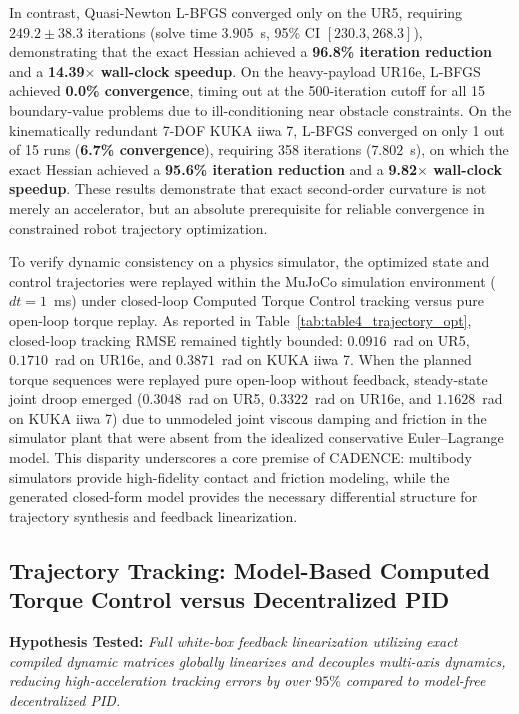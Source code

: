 \documentclass[fleqn,10pt]{article}
\begin{document}
In contrast, Quasi-Newton L-BFGS converged only on the UR5, requiring $249.2 \pm 38.3$ iterations (solve time $3.905$~s, 95\% CI $[230.3, 268.3]$), demonstrating that the exact Hessian achieved a \textbf{96.8\% iteration reduction} and a \textbf{14.39$\times$ wall-clock speedup}. On the heavy-payload UR16e, L-BFGS achieved \textbf{0.0\% convergence}, timing out at the 500-iteration cutoff for all 15 boundary-value problems due to ill-conditioning near obstacle constraints. On the kinematically redundant 7-DOF KUKA iiwa 7, L-BFGS converged on only 1 out of 15 runs (\textbf{6.7\% convergence}), requiring 358 iterations ($7.802$~s), on which the exact Hessian achieved a \textbf{95.6\% iteration reduction} and a \textbf{9.82$\times$ wall-clock speedup}. These results demonstrate that exact second-order curvature is not merely an accelerator, but an absolute prerequisite for reliable convergence in constrained robot trajectory optimization.

To verify dynamic consistency on a physics simulator, the optimized state and control trajectories were replayed within the MuJoCo simulation environment ($dt = 1$~ms) under closed-loop Computed Torque Control tracking versus pure open-loop torque replay. As reported in Table~\ref{tab:table4_trajectory_opt}, closed-loop tracking RMSE remained tightly bounded: $0.0916$~rad on UR5, $0.1710$~rad on UR16e, and $0.3871$~rad on KUKA iiwa 7. When the planned torque sequences were replayed pure open-loop without feedback, steady-state joint droop emerged ($0.3048$~rad on UR5, $0.3322$~rad on UR16e, and $1.1628$~rad on KUKA iiwa 7) due to unmodeled joint viscous damping and friction in the simulator plant that were absent from the idealized conservative Euler--Lagrange model. This disparity underscores a core premise of CADENCE: multibody simulators provide high-fidelity contact and friction modeling, while the generated closed-form model provides the necessary differential structure for trajectory synthesis and feedback linearization.

\subsection{Trajectory Tracking: Model-Based Computed Torque Control versus Decentralized PID}

\noindent\textbf{Hypothesis Tested:} \textit{Full white-box feedback linearization utilizing exact compiled dynamic matrices globally linearizes and decouples multi-axis dynamics, reducing high-acceleration tracking errors by over $95\%$ compared to model-free decentralized PID.}
\end{document}
